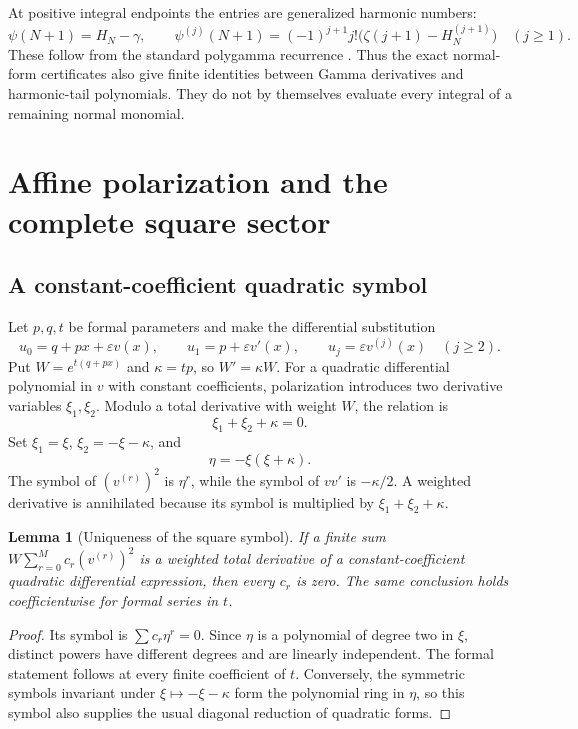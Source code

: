 \documentclass[11pt,letterpaper]{article}
\numberwithin{equation}{section}
\newtheorem{lemma}[theorem]{Lemma}
\theoremstyle{definition}\newtheorem{definition}[theorem]{Definition}
\theoremstyle{remark}\newtheorem{remark}[theorem]{Remark}
\begin{document}
At positive integral endpoints the entries are generalized harmonic
numbers:
\begin{equation}\label{ag:eq:harmonic-substitution}
 \psi(N+1)=H_N-\gamma,\qquad
 \psi^{(j)}(N+1)=(-1)^{j+1}j!\bigl(\zeta(j+1)-H_N^{(j+1)}\bigr)
 \quad(j\ge1).
\end{equation}
These follow from the standard polygamma recurrence \cite{DLMFpsi}.
Thus the exact normal-form certificates also give finite identities
between Gamma derivatives and harmonic-tail polynomials. They do not
by themselves evaluate every integral of a remaining normal monomial.



\section{Affine polarization and the complete square sector}
\label{ag:sec:polarization}

\subsection{A constant-coefficient quadratic symbol}
Let $p,q,t$ be formal parameters and make the differential substitution
\begin{equation}\label{ag:eq:affine}
 u_0=q+px+\varepsilon v(x),\qquad
 u_1=p+\varepsilon v'(x),\qquad
 u_j=\varepsilon v^{(j)}(x)\quad(j\ge2).
\end{equation}
Put $W=e^{t(q+px)}$ and $\kappa=tp$, so $W'=\kappa W$.
For a quadratic differential polynomial in $v$ with constant
coefficients, polarization introduces two derivative variables
$\xi_1,\xi_2$. Modulo a total derivative with weight $W$, the relation is
\[
 \xi_1+\xi_2+\kappa=0.
\]
Set $\xi_1=\xi$, $\xi_2=-\xi-\kappa$, and
\begin{equation}\label{ag:eq:eta}
 \eta=-\xi(\xi+\kappa).
\end{equation}
The symbol of $(v^{(r)})^2$ is $\eta^r$, while the symbol of $vv'$ is
$-\kappa/2$. A weighted derivative is annihilated because its symbol is
multiplied by $\xi_1+\xi_2+\kappa$.

\begin{lemma}[Uniqueness of the square symbol]\label{ag:lem:symbol}
If a finite sum $W\sum_{r=0}^M c_r(v^{(r)})^2$ is a weighted total
derivative of a constant-coefficient quadratic differential expression,
then every $c_r$ is zero. The same conclusion holds coefficientwise for
formal series in $t$.
\end{lemma}
\begin{proof}
Its symbol is $\sum c_r\eta^r=0$. Since $\eta$ is a polynomial of
degree two in $\xi$, distinct powers have different degrees and are
linearly independent. The formal statement follows at every finite
coefficient of $t$. Conversely, the symmetric symbols invariant under
$\xi\mapsto-\xi-\kappa$ form the polynomial ring in $\eta$, so this
symbol also supplies the usual diagonal reduction of quadratic forms.
\end{proof}
\end{document}
